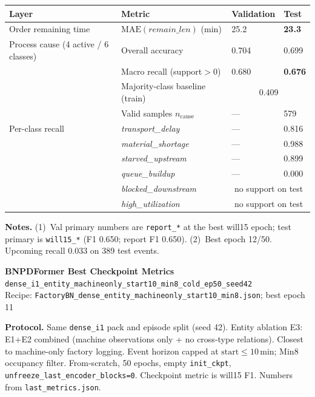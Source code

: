 \documentclass[10pt,a4paper]{article}
\begin{document}
\begin{center}
\begin{tabular}{l l l l}
\toprule
Layer & Metric & Validation & Test \\
\midrule
Order remaining time
  & $\mathrm{MAE}(\textit{remain\_len})$ (min)
  & 25.2
  & \textbf{23.3} \\
\midrule
Process cause (4 active / 6 classes)
  & Overall accuracy
  & 0.704
  & 0.699 \\
  & Macro recall (support${>}0$)
  & 0.680
  & \textbf{0.676} \\
  & Majority-class baseline (train)
  & \multicolumn{2}{c}{0.409} \\
  & Valid samples $n_{\mathrm{cause}}$
  & ---
  & 579 \\
\midrule
Per-class recall
  & \textit{transport\_delay}
  & --- & 0.816 \\
  & \textit{material\_shortage}
  & --- & 0.988 \\
  & \textit{starved\_upstream}
  & --- & 0.899 \\
  & \textit{queue\_buildup}
  & --- & 0.000 \\
  & \textit{blocked\_downstream}
  & \multicolumn{2}{c}{no support on test} \\
  & \textit{high\_utilization}
  & \multicolumn{2}{c}{no support on test} \\
\bottomrule
\end{tabular}
\end{center}

\small
\textbf{Notes.}
(1)~Val primary numbers are \texttt{report\_*} at the best will15 epoch; test primary is \texttt{will15\_*} (F1 0.650; report F1 0.650).
(2)~Best epoch 12/50. Upcoming recall 0.033 on 389 test events.

\clearpage
\begin{center}
{\LARGE\bfseries BNPDFormer Best Checkpoint Metrics}\\[3pt]
{\large\texttt{dense\_i1\_entity\_machineonly\_start10\_min8\_cold\_ep50\_seed42}}\\[2pt]
{\normalsize Recipe: \texttt{FactoryBN\_dense\_entity\_machineonly\_start10\_min8.json}; best epoch 11}
\end{center}

\textbf{Protocol.}
Same \texttt{dense\_i1} pack and episode split (seed 42).
Entity ablation E3: E1+E2 combined (machine observations only + no cross-type relations). Closest to machine-only factory logging.
Event horizon capped at $\mathrm{start}\le 10$\,min; Min8 occupancy filter.
From-scratch, 50 epochs, empty \texttt{init\_ckpt}, \texttt{unfreeze\_last\_encoder\_blocks=0}.
Checkpoint metric is will15 F1.
Numbers from \texttt{last\_metrics.json}.
\end{document}
